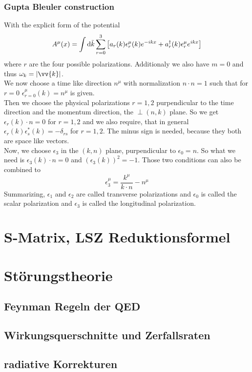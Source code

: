 \documentclass{include/thesisclass}
\newcommand{\cc}{\cdot}
\newcommand{\dd}{{\rm d}}
\newcommand{\eps}{\epsilon}
\begin{document}
\subsection{Gupta Bleuler construction}
With the explicit form of the potential
\[ A^\mu (x) = \int \dd \tilde k \sum_{r = 0}^3 \left[ a_r(k) \eps^\mu_r(k) e^{-ikx} + a_r^\dagger(k) \eps_r^\mu e^{ikx}\right]\]
where $r$ are the four possible polarizations. Additionaly we also have $m = 0$ and thus $ \omega_k = | \vv{k} |$.\\
We now choose a time like direction $n^\mu$ with normalization $n\cc n = 1$ such that for $ r = 0$ $\eps_{r = 0}^\mu(k) = n^\mu$ is given.\\
Then we choose the physical polarizations $r = 1,2$ purpendicular to the time direction and the momentum direction, the $\perp (n,k)$ plane.
So we get $\eps_r(k)\cc n = 0$ for $r = 1,2$ and we also require, that in general $\eps_r(k) \eps_s^*(k) = - \delta_{rs}$ for $r = 1,2$.
The minus sign is needed, because they both are space like vectors.\\
Now, we choose $\eps_3$ in the $(k,n)$ plane, purpendicular to $\eps_0 = n$.
So what we need is $\eps_3(k) \cc n = 0$ and $(\eps_3(k))^2 = -1$. Those two conditions can also be combined to
\[\eps_3^\mu = \frac{ k^\mu}{k \cc n} - n^\mu\]
Summarizing, $\eps_1$ and $\eps_2$ are called transverse polarizations and $\eps_0$ is called the scalar polarization and $\eps_3$ is called the longitudinal polarization.





\chapter{S-Matrix, LSZ Reduktionsformel}

\chapter{Störungstheorie}	
\section{Feynman Regeln der QED}
\section{Wirkungsquerschnitte und Zerfallsraten}
\section{radiative Korrekturen}
\end{document}
